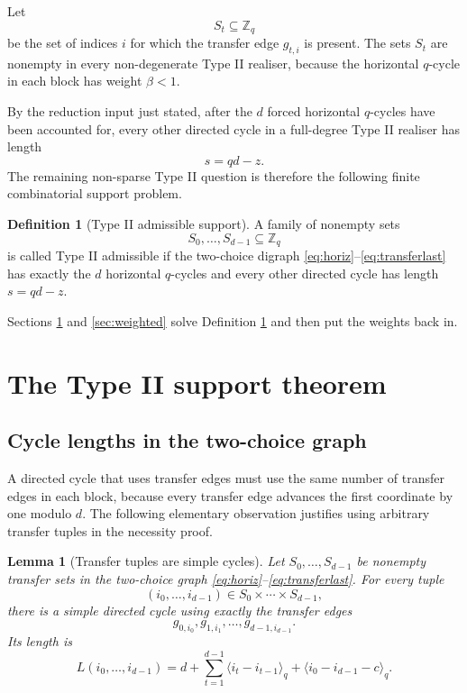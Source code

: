 \documentclass[11pt]{article}
\newtheorem{lemma}[theorem]{Lemma}
\theoremstyle{definition}
\newtheorem{definition}[theorem]{Definition}
\theoremstyle{remark}
\begin{document}
Let
\[
        S_t\subseteq\mathbb Z_q
\]
be the set of indices $i$ for which the transfer edge $g_{t,i}$ is present.  The sets $S_t$ are nonempty in every non-degenerate Type II realiser, because the horizontal $q$-cycle in each block has weight $\beta<1$.

By the reduction input just stated, after the $d$ forced horizontal $q$-cycles have been accounted for, every other directed cycle in a full-degree Type II realiser has length
\[
        s=qd-z .
\]
The remaining non-sparse Type II question is therefore the following finite combinatorial support problem.

\begin{definition}[Type II admissible support]
\label{def:admissible}
A family of nonempty sets
\[
        S_0,\ldots,S_{d-1}\subseteq\mathbb Z_q
\]
is called Type II admissible if the two-choice digraph \eqref{eq:horiz}--\eqref{eq:transferlast} has exactly the $d$ horizontal $q$-cycles and every other directed cycle has length $s=qd-z$.
\end{definition}

Sections \ref{sec:support} and \ref{sec:weighted} solve Definition \ref{def:admissible} and then put the weights back in.

\section{The Type II support theorem}
\label{sec:support}

\subsection{Cycle lengths in the two-choice graph}

A directed cycle that uses transfer edges must use the same number of transfer edges in each block, because every transfer edge advances the first coordinate by one modulo $d$.  The following elementary observation justifies using arbitrary transfer tuples in the necessity proof.

\begin{lemma}[Transfer tuples are simple cycles]
\label{lem:tuple-simple}
Let $S_0,\ldots,S_{d-1}$ be nonempty transfer sets in the two-choice graph \eqref{eq:horiz}--\eqref{eq:transferlast}.  For every tuple
\[
        (i_0,\ldots,i_{d-1})\in S_0\times\cdots\times S_{d-1},
\]
there is a simple directed cycle using exactly the transfer edges
\[
        g_{0,i_0},g_{1,i_1},\ldots,g_{d-1,i_{d-1}}.
\]
Its length is
\begin{equation}
        L(i_0,\ldots,i_{d-1})
        =d+\sum_{t=1}^{d-1}\langle i_t-i_{t-1}\rangle_q
          +\langle i_0-i_{d-1}-c\rangle_q .
        \label{eq:lengthone}
\end{equation}
\end{lemma}
\end{document}
